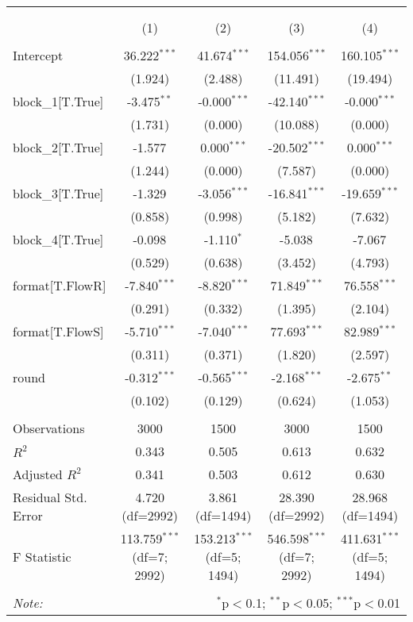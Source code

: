\begin{table}[!htbp] \centering
\begin{tabular}{@{\extracolsep{5pt}}lcccc}
\\[-1.8ex]\hline
\hline \\[-1.8ex]
\\[-1.8ex] & (1) & (2) & (3) & (4) \\
\hline \\[-1.8ex]
 Intercept & 36.222$^{***}$ & 41.674$^{***}$ & 154.056$^{***}$ & 160.105$^{***}$ \\
& (1.924) & (2.488) & (11.491) & (19.494) \\
 block_1[T.True] & -3.475$^{**}$ & -0.000$^{***}$ & -42.140$^{***}$ & -0.000$^{***}$ \\
& (1.731) & (0.000) & (10.088) & (0.000) \\
 block_2[T.True] & -1.577$^{}$ & 0.000$^{***}$ & -20.502$^{***}$ & 0.000$^{***}$ \\
& (1.244) & (0.000) & (7.587) & (0.000) \\
 block_3[T.True] & -1.329$^{}$ & -3.056$^{***}$ & -16.841$^{***}$ & -19.659$^{***}$ \\
& (0.858) & (0.998) & (5.182) & (7.632) \\
 block_4[T.True] & -0.098$^{}$ & -1.110$^{*}$ & -5.038$^{}$ & -7.067$^{}$ \\
& (0.529) & (0.638) & (3.452) & (4.793) \\
 format[T.FlowR] & -7.840$^{***}$ & -8.820$^{***}$ & 71.849$^{***}$ & 76.558$^{***}$ \\
& (0.291) & (0.332) & (1.395) & (2.104) \\
 format[T.FlowS] & -5.710$^{***}$ & -7.040$^{***}$ & 77.693$^{***}$ & 82.989$^{***}$ \\
& (0.311) & (0.371) & (1.820) & (2.597) \\
 round & -0.312$^{***}$ & -0.565$^{***}$ & -2.168$^{***}$ & -2.675$^{**}$ \\
& (0.102) & (0.129) & (0.624) & (1.053) \\
\hline \\[-1.8ex]
 Observations & 3000 & 1500 & 3000 & 1500 \\
 $R^2$ & 0.343 & 0.505 & 0.613 & 0.632 \\
 Adjusted $R^2$ & 0.341 & 0.503 & 0.612 & 0.630 \\
 Residual Std. Error & 4.720 (df=2992) & 3.861 (df=1494) & 28.390 (df=2992) & 28.968 (df=1494) \\
 F Statistic & 113.759$^{***}$ (df=7; 2992) & 153.213$^{***}$ (df=5; 1494) & 546.598$^{***}$ (df=7; 2992) & 411.631$^{***}$ (df=5; 1494) \\
\hline
\hline \\[-1.8ex]
\textit{Note:} & \multicolumn{4}{r}{$^{*}$p$<$0.1; $^{**}$p$<$0.05; $^{***}$p$<$0.01} \\
\end{tabular}
\end{table}